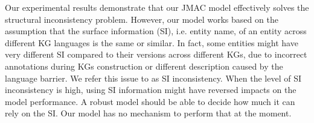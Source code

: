 \documentclass[11pt]{article}
\begin{document}
Our experimental results demonstrate that our JMAC model effectively solves the structural inconsistency problem. However, our model works based on the assumption that the surface information (SI), i.e. entity name, of an entity across different KG languages is the same or similar. In fact, some entities might have very different SI compared to their versions across different KGs, due to incorrect annotations during KGs construction or different description caused by the language barrier. We refer this issue to as SI inconsistency. When the level of SI inconsistency is high, using SI information might have reversed impacts on the model performance. A robust model should be able to decide how much it can rely on the SI. Our model has no mechanism to perform that at the moment. 




\end{document}
